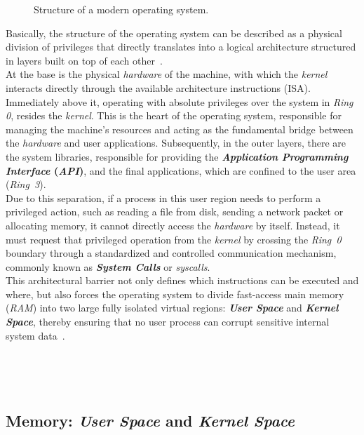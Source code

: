 \begin{figure}[h!]
  \centering
  \scalebox{1.1}{}
  \caption{Structure of a modern operating system.}
  \label{fig:os_structure}
\end{figure}

Basically, the structure of the operating system can be described as a physical division of privileges that directly translates into a logical architecture structured in layers built on top of each other~\cite{librossoo}.\\

At the base is the physical \textit{hardware} of the machine, with which the \textit{kernel} interacts directly through the available architecture instructions (ISA).
Immediately above it, operating with absolute privileges over the system in \textit{Ring 0}, resides the \textit{kernel}. This is the heart of the operating system, responsible for managing the machine's resources and acting as the fundamental bridge between the \textit{hardware} and user applications.
Subsequently, in the outer layers, there are the system libraries, responsible for providing the \textbf{\textit{Application Programming Interface} (\textit{API})}, and the final applications, which are confined to the user area (\textit{Ring~3}).\\

Due to this separation, if a process in this user region needs to perform a privileged action, such as reading a file from disk, sending a network packet or allocating memory, it cannot directly access the \textit{hardware} by itself.
Instead, it must request that privileged operation from the \textit{kernel} by crossing the \textit{Ring~0} boundary through a standardized and controlled communication mechanism, commonly known as \textbf{\textit{System Calls}} or \textit{syscalls}.\\

This architectural barrier not only defines which instructions can be executed and where, but also forces the operating system to divide fast-access main memory (\textit{RAM}) into two large fully isolated virtual regions: \textbf{\textit{User Space}} and \textbf{\textit{Kernel Space}},
thereby ensuring that no user process can corrupt sensitive internal system data~\cite{love_linux, librossoo}.

\

\

\subsection{Memory: \textit{User Space} and \textit{Kernel Space}}
\label{sec:uskrspaces}

